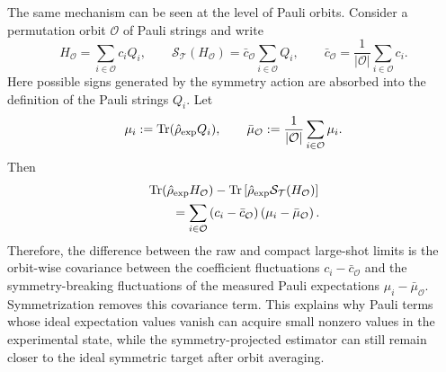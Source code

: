 \documentclass[prl,aps,notitlepage,superscriptaddress,showpacs,nofootinbib]{revtex4-2}
\begin{document}
{The same mechanism can be seen at the level of Pauli orbits. Consider a
permutation orbit $\mathcal O$ of Pauli strings and write
\begin{equation}
    H_{\mathcal O}
    =
    \sum_{i\in\mathcal O}
    c_i Q_i ,
    \qquad
    \mathcal{S}_{\mathcal T}(H_{\mathcal O})
    =
    \bar{c}_{\mathcal O}
    \sum_{i\in\mathcal O}
    Q_i ,
    \qquad
    \bar{c}_{\mathcal O}
    =
    \frac{1}{|\mathcal O|}
    \sum_{i\in\mathcal O}
    c_i .
    \label{eq:pauli_orbit_sym}
\end{equation}
Here possible signs generated by the symmetry action are absorbed into the
definition of the Pauli strings $Q_i$. Let
\begin{equation}
    \mu_i
    :=
    \operatorname{Tr}(\hat{\rho}_{\rm exp}Q_i),
    \qquad
    \bar{\mu}_{\mathcal O}
    :=
    \frac{1}{|\mathcal O|}
    \sum_{i\in\mathcal O}
    \mu_i .
\end{equation}
Then
\begin{align}
    &
    \operatorname{Tr}(\hat{\rho}_{\rm exp}H_{\mathcal O})
    -
    \operatorname{Tr}
    \left[
        \hat{\rho}_{\rm exp}
        \mathcal{S}_{\mathcal T}(H_{\mathcal O})
    \right]
    \notag \\
    &\hspace{2em}
    =
    \sum_{i\in\mathcal O}
    \left(
        c_i
        -
        \bar{c}_{\mathcal O}
    \right)
    \left(
        \mu_i
        -
        \bar{\mu}_{\mathcal O}
    \right).
    \label{eq:orbit_covariance}
\end{align}
Therefore, the difference between the raw and compact large-shot limits is the
orbit-wise covariance between the coefficient fluctuations
$c_i-\bar{c}_{\mathcal O}$ and the symmetry-breaking fluctuations of the
measured Pauli expectations $\mu_i-\bar{\mu}_{\mathcal O}$. Symmetrization
removes this covariance term. This explains why Pauli terms whose ideal
expectation values vanish can acquire small nonzero values in the experimental
state, while the symmetry-projected estimator can still remain closer to the
ideal symmetric target after orbit averaging.

}
\end{document}
